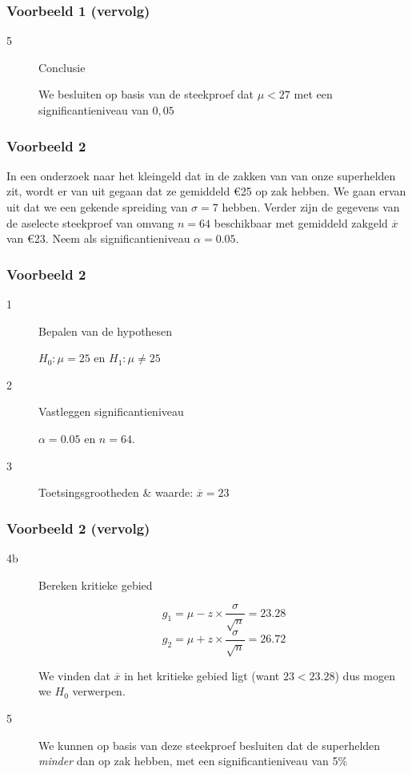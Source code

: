 \documentclass[aspectratio=169]{beamer}
\begin{document}
\begin{frame}
  \frametitle{Voorbeeld 1 (vervolg)}
  
  \begin{description}
    
    \item[5] Conclusie
    
    We besluiten op basis van de steekproef dat $\mu < 27$ met een significantieniveau van $0,05$
  \end{description}
\end{frame}


\begin{frame}
  \frametitle{Voorbeeld 2}
  In een onderzoek naar het kleingeld dat in de zakken van  van  onze superhelden zit, wordt er van uit gegaan dat ze gemiddeld \euro{25} op zak hebben. We gaan ervan uit dat we een gekende spreiding van $\sigma = 7$ hebben. Verder zijn de gegevens van de aselecte steekproef van omvang $n=64$ beschikbaar met gemiddeld zakgeld $\overline{x}$ van \euro{23}. Neem als significantieniveau $\alpha = 0.05$.
\end{frame}

\begin{frame}
  \frametitle{Voorbeeld 2}
  
  \begin{description}
    \item[1] Bepalen van de hypothesen
    
    $H_{0} : \mu = 25$ en $H_{1}: \mu \neq 25$
    
    \item[2] Vastleggen significantieniveau
    
    $\alpha = 0.05$ en $n=64$.
    
    \item[3] Toetsingsgrootheden \& waarde: $\overline{x} = 23$
  \end{description}
  
\end{frame}

\begin{frame}
  \frametitle{Voorbeeld 2 (vervolg)}
  
  \begin{description}
    \item[4b] Bereken kritieke gebied
    
    \[ g_{1} = \mu - z \times \frac{\sigma}{\sqrt{n}} = 23.28 \]
    \[ g_{2} = \mu + z \times \frac{\sigma}{\sqrt{n}} = 26.72 \]
    
    We vinden dat $\overline{x}$ in het kritieke gebied ligt (want $23 < 23.28$) dus mogen we $H_{0}$ verwerpen.
    \item[5] We kunnen op basis van deze steekproef besluiten dat de superhelden \textit{minder} dan  op zak hebben, met een significantieniveau van 5\%
  \end{description}
\end{frame}
\end{document}
